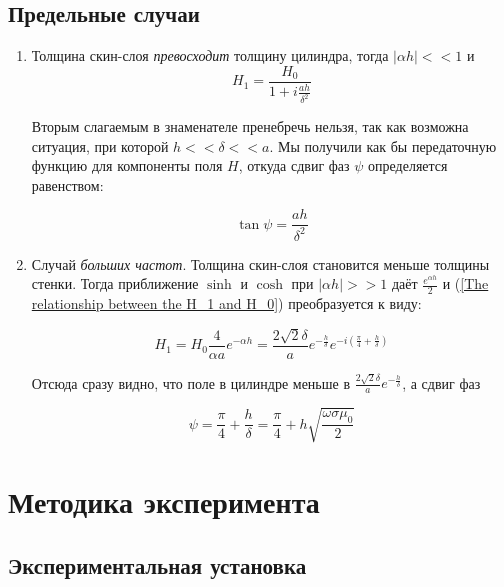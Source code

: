 \documentclass[a4paper, 12pt]{article} %
\begin{document}
\subsection{Предельные случаи}
\begin{enumerate}
    \item Толщина скин-слоя \textit{превосходит} толщину цилиндра, тогда $|\alpha h| << 1$ и 
    \begin{equation}
        H_1 = \frac{H_0}{1 + i\frac{ah}{\delta^2}}
        \label{frequency response}
    \end{equation}

Вторым слагаемым в знаменателе пренебречь нельзя, так как возможна ситуация, при которой $h << \delta << a$. Мы получили как бы передаточную функцию для компоненты поля $H$, откуда сдвиг фаз $\psi$ определяется равенством:

\begin{equation}
    \tan{\psi} = \frac{a h}{\delta^2}
    \label{low frequencies phase}
\end{equation}

    \item Случай \textit{больших частот}. Толщина скин-слоя становится меньше толщины стенки. Тогда приближение $\sinh$ и $\cosh$ при $|\alpha h| >> 1$ даёт $\frac{e^{\alpha h}}{2}$ и (\ref{The relationship between the H_1 and H_0}) преобразуется к виду:

\begin{equation}
    H_1 = H_0 \frac{4}{\alpha a} e^{- \alpha h} = \frac{2 \sqrt{2} \delta}{a} e^{- \frac{h}{\delta}} e^{-i \left(\frac{\pi}{4} + \frac{h}{\delta}\right)}
\end{equation}

Отсюда сразу видно, что поле в цилиндре меньше в $\frac{2 \sqrt{2} \delta}{a} e^{- \frac{h}{\delta}}$, а сдвиг фаз 

\begin{equation}
    \psi = \frac{\pi}{4} + \frac{h}{\delta} = \frac{\pi}{4} + h\sqrt{\frac{\omega \sigma \mu_0}{2}}
    \label{high frequenncies phase}
\end{equation}

\end{enumerate}

\section{Методика эксперимента}

\subsection{Экспериментальная установка}
\end{document}

